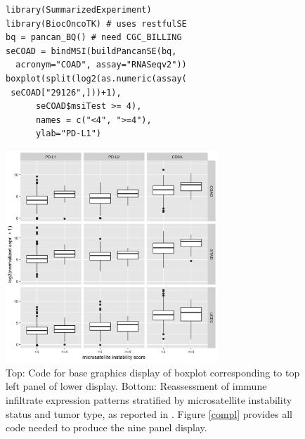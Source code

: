 \begin{figure}
\begin{verbatim}
library(SummarizedExperiment)
library(BiocOncoTK) # uses restfulSE
bq = pancan_BQ() # need CGC_BILLING
seCOAD = bindMSI(buildPancanSE(bq, 
  acronym="COAD", assay="RNASeqv2"))
boxplot(split(log2(as.numeric(assay(
 seCOAD["29126",]))+1), 
      seCOAD$msiTest >= 4),
      names = c("<4", ">=4"), 
      ylab="PD-L1")
\end{verbatim}
\includegraphics[height=8.0cm]{microsatpan2.png}
\caption{Top: Code for base graphics display of boxplot
corresponding to top left panel of lower display.
Bottom: Reassessment of immune infiltrate expression
patterns stratified by microsatellite instability
status and tumor type, as reported in \cite{Bailey2018}.
Figure \ref{compl} provides all
code needed to produce the nine panel display.}
\label{pancanPanel}
\end{figure}

